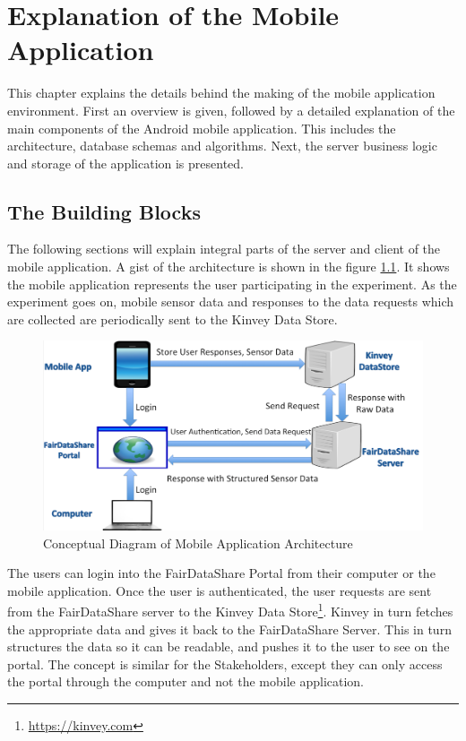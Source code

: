 \chapter{Explanation of the Mobile Application}
This chapter explains the details behind the making of the mobile application environment. First an overview is given, followed by a detailed explanation of the main components of the Android mobile application. This includes the architecture, database schemas and algorithms. Next, the server business logic and storage of the application is presented.

\section{The Building Blocks}

The following sections will explain integral parts of the server and client of the mobile application. A gist of the architecture is shown
in the figure \ref{fig:bb}. It shows the mobile application represents the user participating in the experiment. As the experiment goes on,
mobile sensor data and responses to the data requests which are collected are periodically sent to the Kinvey Data Store. 

\begin{figure}[ht!]
\centering
\includegraphics[width=\textwidth,keepaspectratio]{./images/blocks_app}
\caption{Conceptual Diagram of Mobile Application Architecture}
\label{fig:bb}
\end{figure}

The users can login into the FairDataShare Portal from their computer or the mobile application. Once the user is authenticated, the user requests
are sent from the FairDataShare server to the Kinvey Data Store\footnote{\url{https://kinvey.com}}. Kinvey in turn fetches the appropriate data and gives it back to the FairDataShare Server. This in turn structures the data so it can be readable, and pushes it to the user to see on the portal. The concept is similar for the Stakeholders, except they can only access the portal through the computer and not the mobile application.


